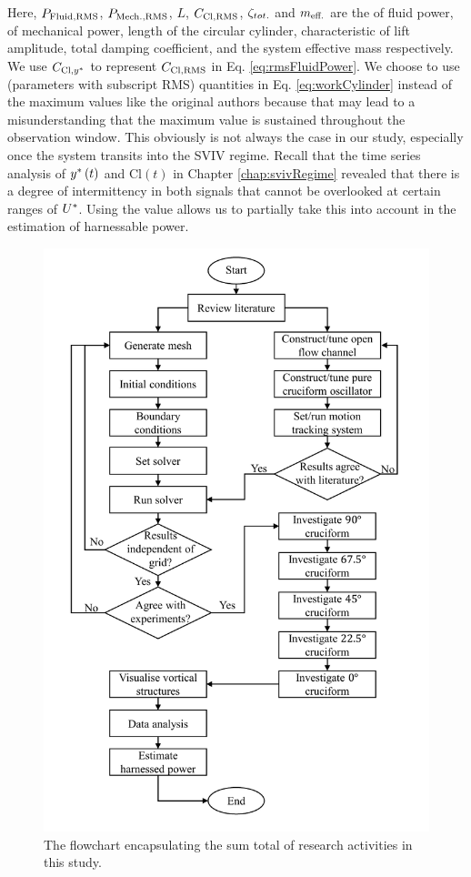 \documentclass[oneside]{utmthesis}
\begin{document}
Here, $P_{\text{Fluid,RMS}}$, $P_{\text{Mech.,RMS}}$, $L$, $C_{\text{Cl},\text{RMS}}$, $\zeta_{tot.}$ and $m_{\text{eff.}}$ are the \rms{} of fluid power, \rms{} of mechanical power, length of the circular cylinder, characteristic \rms{} of lift amplitude, total damping coefficient, and the system effective mass respectively. We use $C_{\text{Cl},y^{*}}$ to represent $C_{\text{Cl},\text{RMS}}$ in Eq. \ref{eq:rmsFluidPower}. We choose to use \rms{} (parameters with subscript RMS) quantities in Eq. \ref{eq:workCylinder} instead of the maximum values like the original authors because that may lead to a misunderstanding that the maximum value is sustained throughout the observation window. This obviously is not always the case in our study, especially once the system transits into the SVIV regime. Recall that the time series analysis of $y^{*}\left( t \right)$ and $\text{Cl}\left( t \right)$ in Chapter \ref{chap:svivRegime} revealed that there is a degree of intermittency in both signals that cannot be overlooked at certain ranges of $U^{*}$. Using the \rms{} value allows us to partially take this into account in the estimation of harnessable power.

\begin{figure}
  \centering
  \includegraphics[width=1\textwidth]{figs/researchMethodology}
  \caption{The flowchart encapsulating the sum total of research activities in this study.}
  \label{fig:researchMethodologyFlowchart}
\end{figure}
\end{document}
